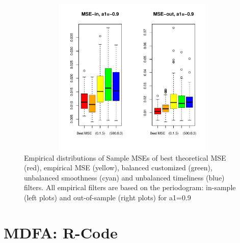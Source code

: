 \documentclass[a4paper]{book}
\begin{document}
\begin{appendix}
\begin{figure}[H]\begin{center}\includegraphics[height=3in, width=6in]{z_box_plot_emp_per_perf_mse_inout_3}\caption{Empirical distributions
  of  Sample MSEs of best theoretical MSE (red), empirical MSE (yellow), balanced customized (green),
  unbalanced smoothness (cyan) and unbalanced timeliness (blue) filters. All empirical filters are based on the periodogram:
  in-sample (left plots) and out-of-sample (right plots) for a1=0.9\label{z_box_plot_emp_per_perf_mse_inout_3}}\end{center}\end{figure}




\section{MDFA: R-Code}



\end{appendix}
\end{document}
